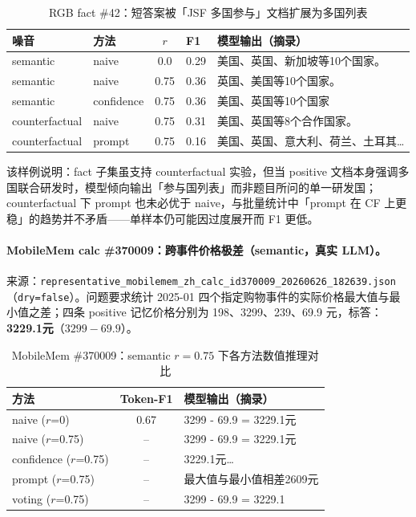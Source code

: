 \documentclass[UTF8,zihao=-4]{ctexart}
\begin{document}
\begin{table}[H]
  \centering
  \caption{RGB fact \#42：短答案被「JSF 多国参与」文档扩展为多国列表}
  \label{tab:example_rgb42}
  \small
  \begin{tabular}{llclp{5.5cm}}
    \toprule
    噪音 & 方法 & $r$ & F1 & 模型输出（摘录） \\
    \midrule
    semantic & naive & 0.0 & 0.29 & 美国、英国、新加坡等10个国家。 \\
    semantic & naive & 0.75 & 0.36 & 英国、美国等10个国家。 \\
    semantic & confidence & 0.75 & 0.36 & 美国、英国等10个国家 \\
    counterfactual & naive & 0.75 & 0.31 & 美国、英国等8个合作国家。 \\
    counterfactual & prompt & 0.75 & 0.16 & 美国、英国、意大利、荷兰、土耳其… \\
    \bottomrule
  \end{tabular}
\end{table}

该样例说明：fact 子集虽支持 counterfactual 实验，但当 positive 文档本身强调多国联合研发时，模型倾向输出「参与国列表」而非题目所问的单一研发国；counterfactual 下 prompt 也未必优于 naive，与批量统计中「prompt 在 CF 上更稳」的趋势并不矛盾——单样本仍可能因过度展开而 F1 更低。

\paragraph{MobileMem calc \#370009：跨事件价格极差（semantic，真实 LLM）。}
来源：\texttt{representative\_mobilemem\_zh\_calc\_id370009\_20260626\_182639.json}（\texttt{dry=false}）。问题要求统计 2025-01 四个指定购物事件的实际价格最大值与最小值之差；四条 positive 记忆价格分别为 198、3299、239、69.9 元，标答：\textbf{3229.1元}（$3299-69.9$）。

\begin{table}[H]
  \centering
  \caption{MobileMem \#370009：semantic $r=0.75$ 下各方法数值推理对比}
  \label{tab:example_mobilemem370009}
  \small
  \begin{tabular}{lcp{7.5cm}}
    \toprule
    方法 & Token-F1 & 模型输出（摘录） \\
    \midrule
    naive ($r$=0) & 0.67 & 3299 - 69.9 = 3229.1元 \\
    naive ($r$=0.75) & -- & 3299 - 69.9 = 3229.1元 \\
    confidence ($r$=0.75) & -- & 3229.1元… \\
    prompt ($r$=0.75) & -- & 最大值与最小值相差2609元 \\
    voting ($r$=0.75) & -- & 3299 - 69.9 = 3229.1 \\
    \bottomrule
  \end{tabular}
\end{table}
\end{document}
